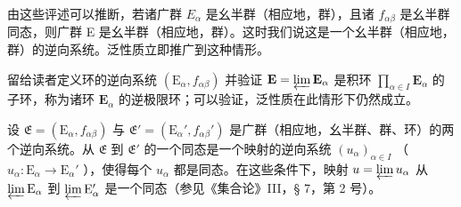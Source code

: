 由这些评述可以推断，若诸广群 \(E_{\alpha}\) 是幺半群（相应地，群），且诸 \(f_{\alpha\beta}\) 是幺半群同态，则广群 E 是幺半群（相应地，群）。这时我们说这是一个幺半群（相应地，群）的逆向系统。泛性质立即推广到这种情形。

留给读者定义环的逆向系统 \((\mathrm{E}_{\alpha}, f_{\alpha \beta})\) 并验证 \(\mathbf{E} = \varprojlim \mathbf{E}_{\alpha}\) 是积环 \(\prod_{\alpha \in I} \mathbf{E}_{\alpha}\) 的子环，称为诸环 \(\mathbf{E}_{\alpha}\) 的逆极限环；可以验证，泛性质在此情形下仍然成立。

设 \(\mathfrak{E} = (\mathrm{E}_{\alpha}, f_{\alpha\beta})\) 与 \(\mathfrak{E}' = (\mathrm{E}_{\alpha}', f_{\alpha\beta}')\) 是广群（相应地，幺半群、群、环）的两个逆向系统。从 \(\mathfrak{E}\) 到 \(\mathfrak{E}'\) 的一个同态是一个映射的逆向系统 \((u_{\alpha})_{\alpha \in I}\) （ \(u_{\alpha}: \mathrm{E}_{\alpha} \to \mathrm{E}_{\alpha}'\) ），使得每个 \(u_{\alpha}\) 都是同态。在这些条件下，映射 \(u = \varprojlim u_{\alpha}\) 从 \(\varprojlim \mathrm{E}_{\alpha}\) 到 \(\varprojlim \mathrm{E}_{\alpha}'\) 是一个同态（参见《集合论》III，§ 7，第 2 号）。

